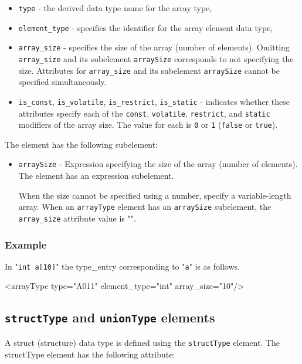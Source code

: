 \begin{itemize}
\item {\tt type} - the derived data type name for the array type,
\item {\tt element\_type} - specifies the identifier for the array element data type,
\item {\tt array\_size} - specifies the size of the array (number of elements). Omitting {\tt array\_size} and its subelement {\tt arraySize} corresponds to not specifying the size. Attributes for {\tt array\_size} and its subelement {\tt arraySize} cannot be specified simultaneously. 
\item {\tt is\_const}, {\tt is\_volatile}, {\tt is\_restrict}, {\tt is\_static} - indicates whether these attributes specify each of the {\tt const}, {\tt volatile}, {\tt restrict}, and {\tt static} modifiers of the array size. The value for each is {\tt 0} or {\tt 1} ({\tt false} or {\tt true}).
\end{itemize}

The element has the following subelement:

\begin{itemize}
\item {\tt arraySize} - Expression specifying the size of the array (number of elements). The element has an expression subelement.

When the size cannot be specified using a number, specify a variable-length array. When an {\tt arrayType} element has an {\tt arraySize} subelement, the {\tt array\_size} attribute value is "{\tt *}". 
\end{itemize}

\subsubsection*{Example}

In "{\tt int a[10]}" the type\_entry corresponding to "{\tt a}" is as follows.
\vspace{2mm}

\begin{XcodeMLExample}
<arrayType type="A011" element_type="int" array_size="10"/>
\end{XcodeMLExample}


\subsection{ {\tt structType} and {\tt unionType} elements}

A struct (structure) data type is defined using the {\tt structType} element. The structType element has the following attribute:

